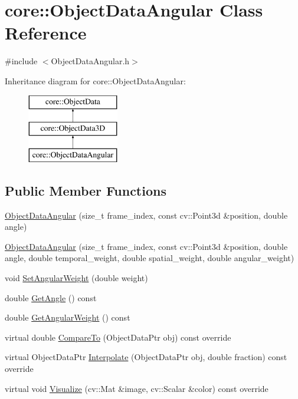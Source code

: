 \hypertarget{classcore_1_1ObjectDataAngular}{}\section{core\+:\+:Object\+Data\+Angular Class Reference}
\label{classcore_1_1ObjectDataAngular}


{\ttfamily \#include $<$Object\+Data\+Angular.\+h$>$}

Inheritance diagram for core\+:\+:Object\+Data\+Angular\+:\begin{figure}[H]
\begin{center}
\leavevmode
\includegraphics[height=3.000000cm]{classcore_1_1ObjectDataAngular}
\end{center}
\end{figure}
\subsection*{Public Member Functions}
\begin{DoxyCompactItemize}
\item 
\hyperlink{classcore_1_1ObjectDataAngular_acc9d75397b5e4aa43a05f2366b00ccfa}{Object\+Data\+Angular} (size\+\_\+t frame\+\_\+index, const cv\+::\+Point3d \&position, double angle)
\item 
\hyperlink{classcore_1_1ObjectDataAngular_ae2c40f53f5dc630d610cf513bf4cd767}{Object\+Data\+Angular} (size\+\_\+t frame\+\_\+index, const cv\+::\+Point3d \&position, double angle, double temporal\+\_\+weight, double spatial\+\_\+weight, double angular\+\_\+weight)
\item 
void \hyperlink{classcore_1_1ObjectDataAngular_af6772caef2337f3c12a3f52049c4d853}{Set\+Angular\+Weight} (double weight)
\item 
double \hyperlink{classcore_1_1ObjectDataAngular_a6c2da5010cd919af3b0f156579d04ef8}{Get\+Angle} () const
\item 
double \hyperlink{classcore_1_1ObjectDataAngular_ae1c5db7b9fc06e648450d9388c93a1aa}{Get\+Angular\+Weight} () const
\item 
virtual double \hyperlink{classcore_1_1ObjectDataAngular_a2932240c6c082b76f2c04723cdf3e4f9}{Compare\+To} (Object\+Data\+Ptr obj) const override
\item 
virtual Object\+Data\+Ptr \hyperlink{classcore_1_1ObjectDataAngular_a42962dd1f994b2577133450e755d586e}{Interpolate} (Object\+Data\+Ptr obj, double fraction) const override
\item 
virtual void \hyperlink{classcore_1_1ObjectDataAngular_acb4265f6de511238460df118148bc85c}{Visualize} (cv\+::\+Mat \&image, cv\+::\+Scalar \&color) const override
\end{DoxyCompactItemize}



